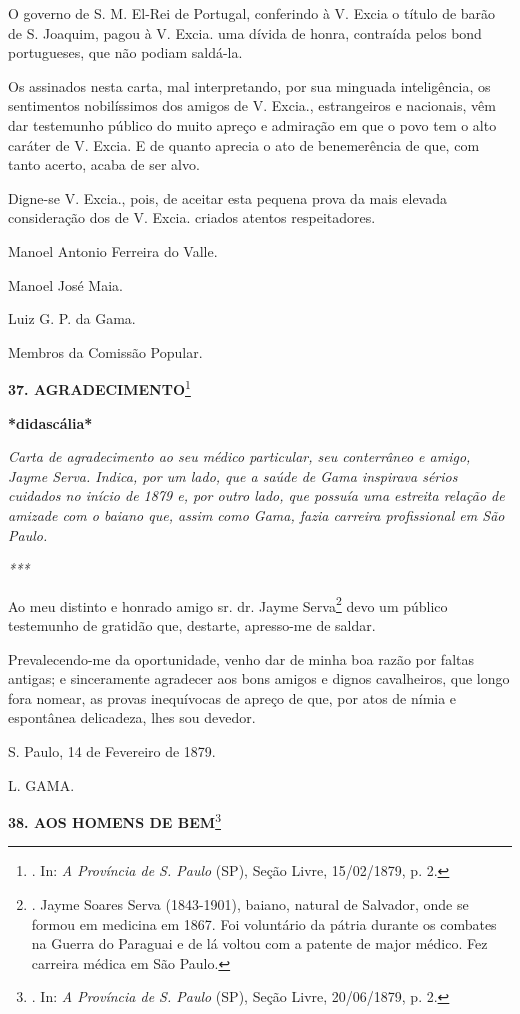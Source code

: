 O governo de S. M. El-Rei de Portugal, conferindo à V. Excia o título de
barão de S. Joaquim, pagou à V. Excia. uma dívida de honra, contraída
pelos bond portugueses, que não podiam saldá-la.

Os assinados nesta carta, mal interpretando, por sua minguada
inteligência, os sentimentos nobilíssimos dos amigos de V. Excia.,
estrangeiros e nacionais, vêm dar testemunho público do muito apreço e
admiração em que o povo tem o alto caráter de V. Excia. E de quanto
aprecia o ato de benemerência de que, com tanto acerto, acaba de ser
alvo.

Digne-se V. Excia., pois, de aceitar esta pequena prova da mais elevada
consideração dos de V. Excia. criados atentos respeitadores.

Manoel Antonio Ferreira do Valle.

Manoel José Maia.

Luiz G. P. da Gama.

Membros da Comissão Popular.

\textbf{37. AGRADECIMENTO}\footnote{. In: \emph{A Província de S. Paulo}
  (SP), Seção Livre, 15/02/1879, p. 2.}

\textbf{*didascália*}

\emph{Carta de agradecimento ao seu médico particular, seu conterrâneo e
amigo, Jayme Serva. Indica, por um lado, que a saúde de Gama inspirava
sérios cuidados no início de 1879 e, por outro lado, que possuía uma
estreita relação de amizade com o baiano que, assim como Gama, fazia
carreira profissional em São Paulo.}

\emph{***}

Ao meu distinto e honrado amigo sr. dr. Jayme Serva\footnote{. Jayme
  Soares Serva (1843-1901), baiano, natural de Salvador, onde se formou
  em medicina em 1867. Foi voluntário da pátria durante os combates na
  Guerra do Paraguai e de lá voltou com a patente de major médico. Fez
  carreira médica em São Paulo.}
dev\protect\hypertarget{Secao_Sem_Titulo-50}{}{}o um público testemunho
de gratidão que, destarte, apresso-me de saldar.

Prevalecendo-me da oportunidade, venho dar de minha boa razão por faltas
antigas; e sinceramente agradecer aos bons amigos e dignos cavalheiros,
que longo fora nomear, as provas inequívocas de apreço de que, por atos
de nímia e espontânea delicadeza, lhes sou devedor.

S. Paulo, 14 de Fevereiro de 1879.

L. GAMA.

\textbf{38. AOS HOMENS DE BEM}\footnote{. In: \emph{A Província de S.
  Paulo} (SP), Seção Livre, 20/06/1879, p. 2.}

